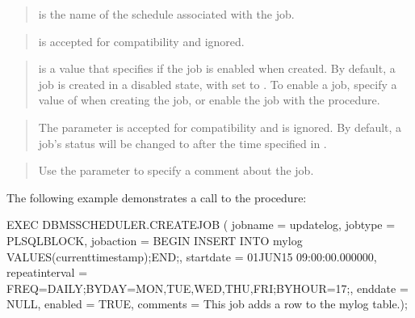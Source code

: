 \documentclass[letterpaper,10pt,english,openany,oneside]{sphinxmanual}
\begin{document}
\begin{quote}

 is the name of the schedule associated with the
job.
\end{quote}

\begin{quote}

 is accepted for compatibility and ignored.
\end{quote}

\begin{quote}

 is a  value that specifies if the job is enabled
when created. By default, a job is created in a disabled state, with
 set to . To enable a job, specify a value of 
when creating the job, or enable the job with the
 procedure.
\end{quote}

\begin{quote}

The  parameter is accepted for compatibility and is
ignored. By default, a job’s status will be changed to 
after the time specified in .
\end{quote}

\begin{quote}

Use the  parameter to specify a comment about the job.
\end{quote}


The following example demonstrates a call to the  procedure:

%
\begin{sphinxVerbatim}[commandchars=\\\{\}]
EXEC
  DBMS\PYGZus{}SCHEDULER.CREATE\PYGZus{}JOB (
    job\PYGZus{}name        =\PYGZgt{} \PYGZsq{}update\PYGZus{}log\PYGZsq{},
    job\PYGZus{}type        =\PYGZgt{} \PYGZsq{}PLSQL\PYGZus{}BLOCK\PYGZsq{},
    job\PYGZus{}action      =\PYGZgt{} \PYGZsq{}BEGIN INSERT INTO my\PYGZus{}log VALUES(current\PYGZus{}timestamp);END;\PYGZsq{},
    start\PYGZus{}date      =\PYGZgt{} \PYGZsq{}01\PYGZhy{}JUN\PYGZhy{}15 09:00:00.000000\PYGZsq{},
    repeat\PYGZus{}interval =\PYGZgt{} \PYGZsq{}FREQ=DAILY;BYDAY=MON,TUE,WED,THU,FRI;BYHOUR=17;\PYGZsq{},
    end\PYGZus{}date        =\PYGZgt{} NULL,
    enabled         =\PYGZgt{} TRUE,
    comments        =\PYGZgt{} \PYGZsq{}This job adds a row to the my\PYGZus{}log table.\PYGZsq{});
\end{sphinxVerbatim}
\end{document}
